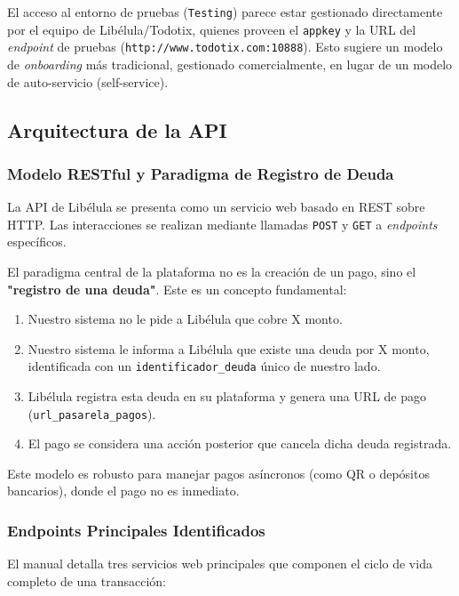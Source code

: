             El acceso al entorno de pruebas (\texttt{Testing}) parece estar gestionado directamente por el equipo de Libélula/Todotix, 
            quienes proveen el \texttt{appkey} y la URL del \emph{endpoint} de pruebas (\texttt{http://www.todotix.com:10888}). Esto 
            sugiere un modelo de \emph{onboarding} más tradicional, gestionado comercialmente, en lugar de un modelo de auto-servicio 
            (self-service).\par

    \subsection{Arquitectura de la API}
        \subsubsection{Modelo RESTful y Paradigma de Registro de Deuda}
            La API de Libélula se presenta como un servicio web basado en REST sobre HTTP. Las interacciones se realizan 
            mediante llamadas \texttt{POST} y \texttt{GET} a \emph{endpoints} específicos.\par
            El paradigma central de la plataforma no es la creación de un pago, sino el \textbf{"registro de una deuda"}. Este es un 
            concepto fundamental:\par
            \begin{enumerate}
                \item Nuestro sistema no le pide a Libélula que cobre X monto.
                \item Nuestro sistema le informa a Libélula que existe una deuda por X monto, identificada con un \texttt{identificador\_deuda} único de nuestro lado.
                \item Libélula registra esta deuda en su plataforma y genera una URL de pago (\texttt{url\_pasarela\_pagos}).
                \item El pago se considera una acción posterior que cancela dicha deuda registrada.
            \end{enumerate}
        Este modelo es robusto para manejar pagos asíncronos (como QR o depósitos bancarios), donde el pago no es inmediato.\par

    \subsubsection{Endpoints Principales Identificados}
        El manual detalla tres servicios web principales que componen el ciclo de vida completo de una transacción:\par

